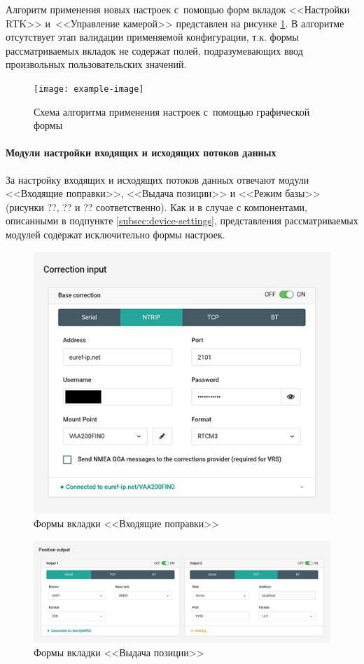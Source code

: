 Алгоритм применения новых настроек с~помощью форм вкладок <<Настройки RTK>> и~<<Управление камерой>> представлен на рисунке \ref{fig:basic-form-apply}. В алгоритме отсутствует этап валидации применяемой конфигурации, т.к. формы рассматриваемых вкладок не содержат полей, подразумевающих ввод произвольных пользовательских значений.

\begin{figure}[h!]
  \centering
  \setlength{\fboxsep}{5pt}
  \texttt{[image: example-image]}
  \vspace*{6pt}
  \caption{Схема алгоритма применения настроек с~помощью графической формы}
  \label{fig:basic-form-apply}
\end{figure}

\paragraph{Модули настройки входящих и исходящих потоков данных}

За настройку входящих и исходящих потоков данных отвечают модули <<Входящие поправки>>, <<Выдача позиции>> и <<Режим базы>> (рисунки ??, ?? и ?? соответственно). Как и в случае с компонентами, описанными в подпункте \ref{subsec:device-settings}, представления рассматриваемых модулей содержат исключительно формы настроек.

\begin{figure}[h!]
  \centering
  \setlength{\fboxsep}{5pt}
  \includegraphics[width=.5\textwidth]{img/reachview/correction-input_content_laptop}
  \vspace*{6pt}
  \caption{Формы вкладки <<Входящие поправки>>}
  \label{fig:correction-input}
\end{figure}

\begin{figure}[h!]
  \centering
  \setlength{\fboxsep}{5pt}
  \includegraphics[width=.8\textwidth]{img/reachview/position-output_content_laptop}
  \vspace*{6pt}
  \caption{Формы вкладки <<Выдача позиции>>}
  \label{fig:position-output}
\end{figure}

